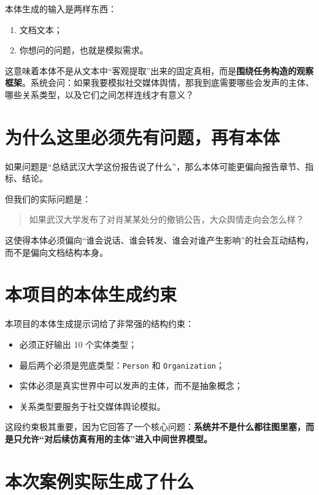 \documentclass[UTF8,10pt,oneside]{ctexbook}
\newcommand{\code}[1]{\nolinkurl{#1}}
\begin{document}
本体生成的输入是两样东西：

\begin{enumerate}
  \item 文档文本；
  \item 你想问的问题，也就是模拟需求。
\end{enumerate}

这意味着本体不是从文本中“客观提取”出来的固定真相，而是\textbf{围绕任务构造的观察框架}。系统会问：如果我要模拟社交媒体舆情，那我到底需要哪些会发声的主体、哪些关系类型，以及它们之间怎样连线才有意义？

\section{为什么这里必须先有问题，再有本体}

如果问题是“总结武汉大学这份报告说了什么”，那么本体可能更偏向报告章节、指标、结论。

但我们的实际问题是：

\begin{quote}
如果武汉大学发布了对肖某某处分的撤销公告，大众舆情走向会怎么样？
\end{quote}

这使得本体必须偏向“谁会说话、谁会转发、谁会对谁产生影响”的社会互动结构，而不是偏向文档结构本身。

\section{本项目的本体生成约束}

本项目的本体生成提示词给了非常强的结构约束：

\begin{itemize}
  \item 必须正好输出 10 个实体类型；
  \item 最后两个必须是兜底类型：\code{Person} 和 \code{Organization}；
  \item 实体必须是真实世界中可以发声的主体，而不是抽象概念；
  \item 关系类型要服务于社交媒体舆论模拟。
\end{itemize}

这段约束极其重要，因为它回答了一个核心问题：\textbf{系统并不是什么都往图里塞，而是只允许“对后续仿真有用的主体”进入中间世界模型。}

\section{本次案例实际生成了什么}
\end{document}
